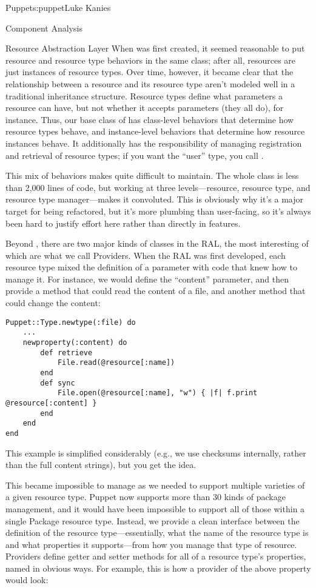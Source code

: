 \begin{aosachapter}{Puppet}{s:puppet}{Luke Kanies}
\begin{aosasect1}{Component Analysis}
\begin{aosasect2}{Resource Abstraction Layer}
When  was first created, it seemed reasonable to put
resource and resource type behaviors in the same class; after all,
resources are just instances of resource types.  Over time, however,
it became clear that the relationship between a resource and its
resource type aren't modeled well in a traditional inheritance
structure.  Resource types define what parameters a resource can have,
but not whether it accepts parameters (they all do), for instance.
Thus, our base class of  has class-level behaviors that
determine how resource types behave, and instance-level behaviors that
determine how resource instances behave.  It additionally has the
responsibility of managing registration and retrieval of resource
types; if you want the ``user'' type, you call
.

This mix of behaviors makes  quite difficult to maintain.
The whole class is less than 2,000 lines of code, but working at three
levels---resource, resource type, and resource type manager---makes
it convoluted.  This is obviously why it's a major target for being
refactored, but it's more plumbing than user-facing, so it's always
been hard to justify effort here rather than directly in features.

Beyond , there are two major kinds of classes in the RAL,
the most interesting of which are what we call Providers.  When the
RAL was first developed, each resource type mixed the definition of a
parameter with code that knew how to manage it.  For instance, we
would define the ``content'' parameter, and then provide a method that
could read the content of a file, and another method that could change
the content:

\begin{verbatim}
Puppet::Type.newtype(:file) do
    ...
    newproperty(:content) do
        def retrieve
            File.read(@resource[:name])
        end
        def sync
            File.open(@resource[:name], "w") { |f| f.print @resource[:content] }
        end
    end
end
\end{verbatim}

\noindent This example is simplified considerably (e.g., we use checksums
internally, rather than the full content strings), but you get the
idea.

This became impossible to manage as we needed to support multiple
varieties of a given resource type.  Puppet now supports more than 30
kinds of package management, and it would have been impossible to
support all of those within a single Package resource type.  Instead,
we provide a clean interface between the definition of the resource
type---essentially, what the name of the resource type is and what
properties it supports---from how you manage that type of resource.
Providers define getter and setter methods for all of a resource
type's properties, named in obvious ways.  For example, this is how a
provider of the above property would look:


\end{aosasect2}
\end{aosasect1}
\end{aosachapter}
